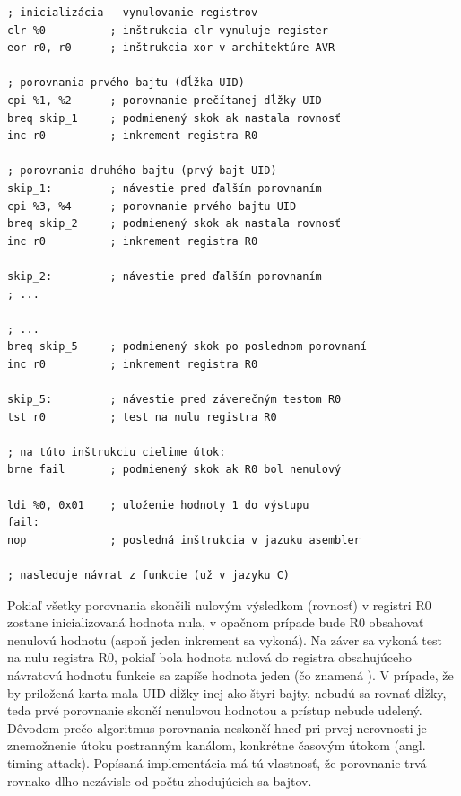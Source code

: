 \begin{lstlisting}[float,language=AVR,caption={Ukážky kódu v jazyku asembler z funkcie \uv{checkAccess} z príkladu 2. \%0 označuje výstupný parameter -- register pre návratovú hodnotou. Ostatné parametre (označené \%) sú argumentami jednotlivých inštrukcií CPI. CPI porovná vždy register -- prečítaný bajt UID a konštantu -- bajt UID \uv{správnej karty} (staticky deklarovaný).},label=alg:asmCTF2]
; inicializácia - vynulovanie registrov
clr %0          ; inštrukcia clr vynuluje register
eor r0, r0      ; inštrukcia xor v architektúre AVR

; porovnania prvého bajtu (dĺžka UID)
cpi %1, %2      ; porovnanie prečítanej dĺžky UID
breq skip_1     ; podmienený skok ak nastala rovnosť
inc r0          ; inkrement registra R0

; porovnania druhého bajtu (prvý bajt UID)
skip_1:         ; návestie pred ďalším porovnaním
cpi %3, %4      ; porovnanie prvého bajtu UID
breq skip_2     ; podmienený skok ak nastala rovnosť
inc r0          ; inkrement registra R0

skip_2:         ; návestie pred ďalším porovnaním
; ...

; ...
breq skip_5     ; podmienený skok po poslednom porovnaní
inc r0          ; inkrement registra R0

skip_5:         ; návestie pred záverečným testom R0
tst r0          ; test na nulu registra R0

; na túto inštrukciu cielime útok:
brne fail       ; podmienený skok ak R0 bol nenulový

ldi %0, 0x01    ; uloženie hodnoty 1 do výstupu
fail:
nop             ; posledná inštrukcia v jazuku asembler

; nasleduje návrat z funkcie (už v jazyku C)
\end{lstlisting}

Pokiaľ všetky porovnania skončili nulovým výsledkom (rovnosť) v registri R0 zostane inicializovaná hodnota nula, v opačnom prípade bude R0 obsahovať nenulovú hodnotu (aspoň jeden inkrement sa vykoná). Na záver sa vykoná test na nulu registra R0, pokiaľ bola hodnota nulová do registra obsahujúceho návratovú hodnotu funkcie sa zapíše hodnota jeden (čo znamená ). V prípade, že by priložená karta mala UID dĺžky inej ako štyri bajty, nebudú sa rovnať dĺžky, teda prvé porovnanie skončí nenulovou hodnotou a prístup nebude udelený. Dôvodom prečo algoritmus porovnania neskončí hneď pri prvej nerovnosti je znemožnenie útoku postranným kanálom, konkrétne časovým útokom (angl. timing attack). Popísaná implementácia má tú vlastnosť, že porovnanie trvá rovnako dlho nezávisle od počtu zhodujúcich sa bajtov.

